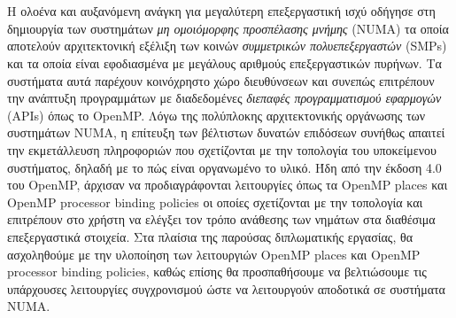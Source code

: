 \chapter*{\abstractname}
\addstarredchapter{\abstractname} %
\makecseabstract


\noindent Η ολοένα και αυξανόμενη ανάγκη για μεγαλύτερη επεξεργαστική ισχύ οδήγησε στη δημιουργία των συστημάτων \textit{μη ομοιόμορφης προσπέλασης μνήμης} (NUMA) τα οποία αποτελούν αρχιτεκτονική εξέλιξη των κοινών \textit{συμμετρικών πολυεπεξεργαστών} (SMPs) και τα οποία είναι εφοδιασμένα με μεγάλους αριθμούς επεξεργαστικών πυρήνων. Τα συστήματα αυτά παρέχουν κοινόχρηστο χώρο διευθύνσεων και συνεπώς επιτρέπουν την ανάπτυξη προγραμμάτων με διαδεδομένες \textit{διεπαφές προγραμματισμού εφαρμογών} (APIs) όπως το OpenMP. Λόγω της πολύπλοκης αρχιτεκτονικής οργάνωσης των συστημάτων NUMA, η επίτευξη των βέλτιστων δυνατών επιδόσεων συνήθως απαιτεί την εκμετάλλευση πληροφοριών που σχετίζονται με την τοπολογία του υποκείμενου συστήματος, δηλαδή με το πώς είναι οργανωμένο το υλικό. Ήδη από την έκδοση 4.0 του OpenMP, άρχισαν να προδιαγράφονται λειτουργίες όπως τα OpenMP places και OpenMP processor binding policies οι οποίες σχετίζονται με την τοπολογία και επιτρέπουν στο χρήστη να ελέγξει τον τρόπο ανάθεσης των νημάτων στα διαθέσιμα επεξεργαστικά στοιχεία. Στα πλαίσια της παρούσας διπλωματικής εργασίας, θα ασχοληθούμε με την υλοποίηση των λειτουργιών OpenMP places και OpenMP processor binding policies, καθώς επίσης θα προσπαθήσουμε να βελτιώσουμε τις υπάρχουσες λειτουργίες συγχρονισμού ώστε να λειτουργούν αποδοτικά σε συστήματα NUMA.


\bigskip